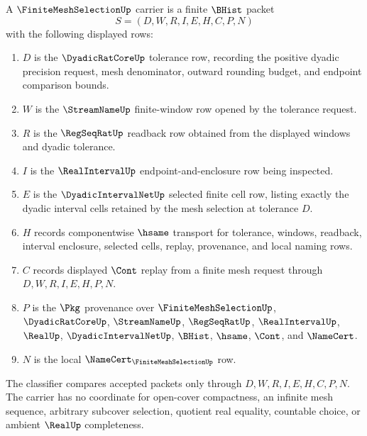 \begin{definition}
\label{def:finite-mesh-selection-carrier}
A $\FiniteMeshSelectionUp$ carrier is a finite $\BHist$ packet
$$
S=(D,W,R,I,E,H,C,P,N)
$$
with the following displayed rows:
\begin{enumerate}
\item $D$ is the $\DyadicRatCoreUp$ tolerance row, recording the positive dyadic precision request, mesh denominator, outward rounding budget, and endpoint comparison bounds.
\item $W$ is the $\StreamNameUp$ finite-window row opened by the tolerance request.
\item $R$ is the $\RegSeqRatUp$ readback row obtained from the displayed windows and dyadic tolerance.
\item $I$ is the $\RealIntervalUp$ endpoint-and-enclosure row being inspected.
\item $E$ is the $\DyadicIntervalNetUp$ selected finite cell row, listing exactly the dyadic interval cells retained by the mesh selection at tolerance $D$.
\item $H$ records componentwise $\hsame$ transport for tolerance, windows, readback, interval enclosure, selected cells, replay, provenance, and local naming rows.
\item $C$ records displayed $\Cont$ replay from a finite mesh request through $D,W,R,I,E,H,P,N$.
\item $P$ is the $\Pkg$ provenance over $\FiniteMeshSelectionUp$, $\DyadicRatCoreUp$, $\StreamNameUp$, $\RegSeqRatUp$, $\RealIntervalUp$, $\RealUp$, $\DyadicIntervalNetUp$, $\BHist$, $\hsame$, $\Cont$, and $\NameCert$.
\item $N$ is the local $\NameCert_{\FiniteMeshSelectionUp}$ row.
\end{enumerate}
The classifier compares accepted packets only through $D,W,R,I,E,H,C,P,N$. The carrier has no coordinate for open-cover compactness, an infinite mesh sequence, arbitrary subcover selection, quotient real equality, countable choice, or ambient $\RealUp$ completeness.
\end{definition}


